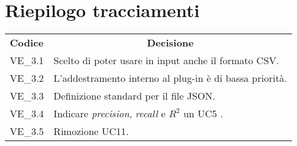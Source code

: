 
\section{Riepilogo tracciamenti}
\begin{longtable} {
		>{\centering}p{17mm} 
		>{}p{120mm}}
	\rowcolor{gray!50}
	\textbf{Codice} & \multicolumn{1}{c}{\textbf{Decisione}} \\%
	VE\_3.1 & Scelto di poter usare in input anche il formato CSV. \TBstrut \\ [2mm]
	VE\_3.2 & L'addestramento interno al plug-in è di bassa priorità. \TBstrut \\ [2mm]
	VE\_3.3 & Definizione standard per il file JSON. \TBstrut \\ [2mm]
	VE\_3.4 & Indicare \textit{precision}, \textit{recall} e \textit{$R^{2}$} un UC5 . \TBstrut \\ [2mm]
	VE\_3.5 & Rimozione UC11. \TBstrut \\ [2mm]
	
\end{longtable}